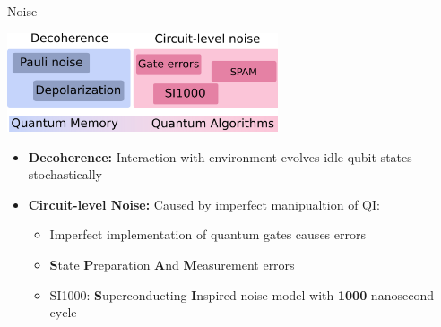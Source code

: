 \documentclass{dfki}
\begin{document}
\begin{frame}{Noise}
	\begin{center}
        \includegraphics[width=0.6\textwidth]{fig/NoiseTypes.png}
    \end{center}
	\small
	\begin{itemize}
		\item \textbf{Decoherence:} Interaction with environment evolves idle qubit states stochastically
		\item \textbf{Circuit-level Noise:} Caused by imperfect manipualtion of QI:
		\begin{itemize}
			\item Imperfect implementation of quantum gates causes errors
			\item \textbf{S}tate \textbf{P}reparation \textbf{A}nd \textbf{M}easurement errors
			\item SI1000: \textbf{S}uperconducting \textbf{I}nspired noise model with \textbf{1000} nanosecond cycle
		\end{itemize}
	\end{itemize}
	\pause
	\begin{overlayarea}{\textwidth}{3cm}
	\vspace{-8cm}
	\hspace{3.5cm}
	\end{overlayarea}
\end{frame}
\end{document}
